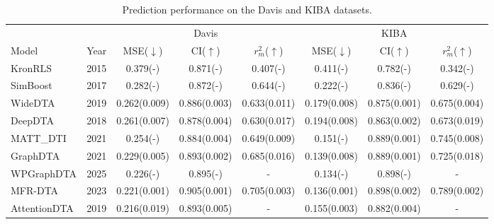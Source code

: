 \documentclass[pdflatex,sn-mathphys-num]{sn-jnl}%
\theoremstyle{thmstyleone}%
\theoremstyle{thmstyletwo}%
\theoremstyle{thmstylethree}%
\begin{document}
\begin{table}[ht]
\caption{Prediction performance on the Davis and KIBA datasets.\label{table4}}
\tabcolsep=0pt
\begin{tabular*}{\textwidth}{@{\extracolsep{\fill}}lccccccc@{}}
\toprule
& & \multicolumn{3}{c}{Davis} & \multicolumn{3}{c}{KIBA} \\
\cmidrule(lr){3-5}\cmidrule(lr){6-8}
Model & Year & MSE($\downarrow$) & CI($\uparrow$) & $r_m^2$($\uparrow$) & MSE($\downarrow$) & CI($\uparrow$) & $r_m^2$($\uparrow$) \\
\midrule
KronRLS\cite{pahikkala2015toward}       & 2015 & 0.379(-)              & 0.871(-)              & 0.407(-)              & 0.411(-)              & 0.782(-)              & 0.342(-)              \\
SimBoost\cite{He2017SimBoost}            & 2017 & 0.282(-)              & 0.872(-)              & 0.644(-)              & 0.222(-)              & 0.836(-)              & 0.629(-)              \\
WideDTA\cite{ozturk2019widedta}          & 2019 & 0.262(0.009)          & 0.886(0.003)          & 0.633(0.011)          & 0.179(0.008)          & 0.875(0.001)          & 0.675(0.004)          \\
DeepDTA\cite{ozturk2018deepdta}          & 2018 & 0.261(0.007)          & 0.878(0.004)          & 0.630(0.017)          & 0.194(0.008)          & 0.863(0.002)          & 0.673(0.019)          \\
MATT\_DTI\cite{zeng2021deep}          & 2021 & 0.254(-)                 & 0.884(0.004)          & 0.649(0.009)          & 0.151(-)              & 0.889(0.001)          & 0.745(0.008)          \\
GraphDTA\cite{nguyen2021graphdta}        & 2021 & 0.229(0.005)          & 0.893(0.002)          & 0.685(0.016)          & 0.139(0.008)          & 0.889(0.001)          & 0.725(0.018)          \\
WPGraphDTA\cite{hu2025powergraph} & 2025        & 0.226(-)              & 0.895(-)               & \multicolumn{1}{c}{-} & 0.134(-)               & 0.898(-)            & \multicolumn{1}{c}{-} \\
MFR-DTA\cite{hua2023mfr}              & 2023 & 0.221(0.001)          & 0.905(0.001)          & 0.705(0.003)          & 0.136(0.001)          & 0.898(0.002)              & 0.789(0.002)          \\
AttentionDTA\cite{zhao2019attentiondta}  & 2019 & 0.216(0.019)          & 0.893(0.005)          & \multicolumn{1}{c}{-} & 0.155(0.003)          & 0.882(0.004)          & \multicolumn{1}{c}{-} \\

\end{tabular*}
\end{table}
\end{document}
